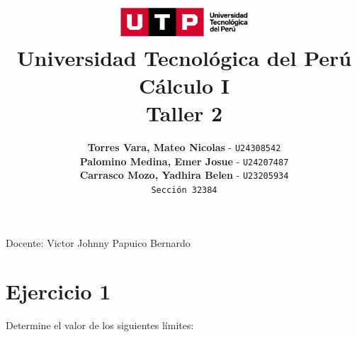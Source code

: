 \documentclass[12pt]{article}
\title{
  \vspace{2cm}
  \pagenumbering{gobble}
  \includegraphics[width=5cm]{../assets/logo-utp.png} \\
  \vspace{1cm}
  \textbf{Universidad Tecnológica del Perú} \\
  \vspace{2cm}
  \textbf{Cálculo I} \\
  \vspace{1cm}
  \large \textbf{Taller 2}
}
\author{
  \textbf{Torres Vara, Mateo Nicolas} - \texttt{U24308542} \\
  \textbf{Palomino Medina, Emer Josue} - \texttt{U24207487} \\
  \textbf{Carrasco Mozo, Yadhira Belen} - \texttt{U23205934} \\
  \texttt{Sección 32384}
}
\begin{document}
\maketitle
\begin{center}

  Docente: Victor Johnny Papuico Bernardo

\end{center}

%
%

\newpage
{}





\section*{Ejercicio 1}
\noindent Determine el valor de los siguientes límites:
\end{document}
